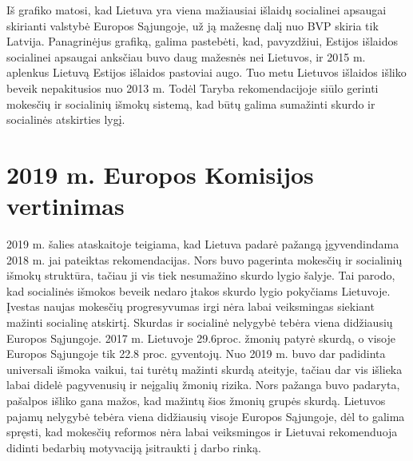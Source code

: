 \documentclass[12pt,titlepage]{article}
\begin{document}
Iš grafiko matosi, kad Lietuva yra viena mažiausiai išlaidų socialinei apsaugai skirianti valstybė Europos Sąjungoje, už ją mažesnę dalį nuo BVP skiria tik Latvija. Panagrinėjus grafiką, galima pastebėti, kad, pavyzdžiui, Estijos išlaidos socialinei apsaugai anksčiau buvo daug mažesnės nei Lietuvos, ir 2015 m. aplenkus Lietuvą Estijos išlaidos pastoviai augo. Tuo metu Lietuvos išlaidos išliko beveik nepakitusios nuo 2013 m. Todėl Taryba rekomendacijoje siūlo gerinti mokesčių ir socialinių išmokų sistemą, kad būtų galima sumažinti skurdo ir socialinės atskirties lygį.

\justify
\section{2019 m. Europos Komisijos vertinimas}

\justify
\hspace{\parindent} 
2019 m. šalies ataskaitoje teigiama, kad Lietuva padarė pažangą įgyvendindama 2018 m. jai pateiktas rekomendacijas. Nors buvo pagerinta mokesčių ir socialinių išmokų struktūra, tačiau ji vis tiek nesumažino skurdo lygio šalyje. Tai parodo, kad socialinės išmokos beveik nedaro įtakos skurdo lygio pokyčiams Lietuvoje. Įvestas naujas mokesčių progresyvumas irgi nėra labai veiksmingas siekiant mažinti socialinę atskirtį. Skurdas ir socialinė nelygybė tebėra viena didžiausių Europos Sąjungoje. 2017 m. Lietuvoje 29.6proc. žmonių patyrė skurdą, o visoje Europos Sąjungoje tik 22.8 proc.  gyventojų. Nuo 2019 m. buvo dar padidinta universali išmoka vaikui, tai turėtų mažinti skurdą ateityje, tačiau dar vis išlieka labai didelė pagyvenusių ir neįgalių žmonių rizika. Nors pažanga buvo padaryta, pašalpos išliko gana mažos, kad mažintų šios žmonių grupės skurdą. Lietuvos pajamų nelygybė tebėra viena didžiausių visoje Europos Sąjungoje, dėl to galima spręsti, kad mokesčių reformos nėra labai veiksmingos ir Lietuvai rekomenduoja didinti bedarbių motyvaciją įsitraukti į darbo rinką.\\
\end{document}
